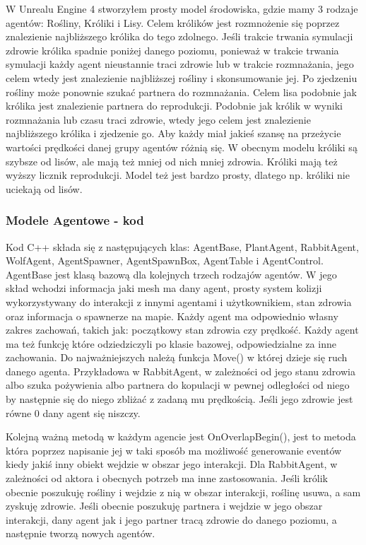 \documentclass[a4paper,12pt,reqno]{article}
\begin{document}
W Unrealu Engine 4 stworzyłem prosty model środowiska, gdzie mamy 3 rodzaje agentów: Rośliny, Króliki i Lisy. Celem królików jest rozmnożenie się poprzez znalezienie najbliższego królika do tego zdolnego. Jeśli trakcie trwania symulacji zdrowie królika spadnie poniżej danego poziomu, ponieważ w trakcie trwania symulacji każdy agent nieustannie traci zdrowie lub w trakcie rozmnażania, jego celem wtedy jest znalezienie najbliższej rośliny i skonsumowanie jej. Po zjedzeniu rośliny może ponownie szukać partnera do rozmnażania.  Celem lisa podobnie jak królika jest znalezienie partnera do reprodukcji. Podobnie jak królik w wyniki rozmnażania lub czasu traci zdrowie, wtedy jego celem jest znalezienie najbliższego królika i zjedzenie go. Aby każdy miał jakieś szansę na przeżycie wartości prędkości danej grupy agentów różnią się. W obecnym modelu króliki są szybsze od lisów, ale mają też mniej od nich mniej zdrowia. Króliki mają też wyższy licznik reprodukcji. Model też jest bardzo prosty, dlatego np. króliki nie uciekają od lisów.
\subsubsection{Modele Agentowe - kod}

Kod C++ składa się z następujących klas: AgentBase, PlantAgent, RabbitAgent, WolfAgent, AgentSpawner, AgentSpawnBox, AgentTable i AgentControl. 
AgentBase jest klasą bazową dla kolejnych trzech rodzajów agentów. W jego skład wchodzi informacja jaki mesh ma dany agent, prosty system kolizji wykorzystywany do interakcji z innymi agentami i użytkownikiem, stan zdrowia oraz informacja o spawnerze na mapie. Każdy agent ma odpowiednio własny zakres zachowań, takich jak: początkowy stan zdrowia czy prędkość. Każdy agent ma też funkcję które odziedziczyli po klasie bazowej, odpowiedzialne za inne zachowania. Do najważniejszych należą funkcja Move() w której dzieje się ruch danego agenta. Przykładowa w RabbitAgent, w zależności od jego stanu zdrowia albo szuka pożywienia albo partnera do kopulacji w pewnej odległości od niego by następnie się do niego zbliżać z zadaną mu prędkością. Jeśli jego zdrowie jest równe 0 dany agent się niszczy.



Kolejną ważną metodą w każdym agencie jest OnOverlapBegin(), jest to metoda która poprzez napisanie jej w taki sposób ma możliwość generowanie eventów kiedy jakiś inny obiekt wejdzie w obszar jego interakcji. Dla RabbitAgent, w zależności od aktora i obecnych potrzeb ma inne zastosowania. Jeśli królik obecnie poszukuję rośliny i wejdzie z nią w obszar interakcji, roślinę usuwa, a sam zyskuję zdrowie. Jeśli obecnie poszukuję partnera i wejdzie w jego obszar interakcji, dany agent jak i jego partner tracą zdrowie do danego poziomu, a następnie tworzą nowych agentów.
	
\end{document}
